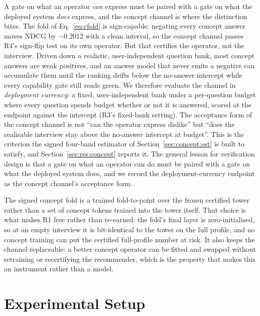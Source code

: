 \documentclass[acmsmall,review,anonymous]{acmart}
\begin{document}
A gate on what an operator \emph{can} express must be paired with a gate on what the deployed system \emph{does} express, and the concept channel is where the distinction bites. The fold of Eq.~\eqref{eq:cfold} is sign-capable: negating every concept answer moves NDCG by $-0.2012$ with a clean interval, so the concept channel passes R4's sign-flip test on its own operator. But that certifies the operator, not the interview. Driven down a realistic, user-independent question bank, most concept answers are weak positives, and an answer model that never emits a negative can accumulate them until the ranking drifts below the no-answer intercept while every capability gate still reads green. We therefore evaluate the channel in \emph{deployment currency}: a fixed, user-independent bank under a per-question budget where every question spends budget whether or not it is answered, scored at the endpoint against the intercept (R3's fixed-bank setting). The acceptance form of the concept channel is not ``can the operator express dislike'' but ``does the realisable interview stay above the no-answer intercept at budget''. This is the criterion the signed four-band estimator of Section~\ref{sec:concept:est} is built to satisfy, and Section~\ref{sec:res:concept} reports it. The general lesson for verification design is that a gate on what an operator can do must be paired with a gate on what the deployed system does, and we record the deployment-currency endpoint as the concept channel's acceptance form.

The signed concept fold is a trained fold-to-point over the frozen certified tower rather than a set of concept tokens trained into the tower itself. That choice is what makes R1 free rather than re-earned: the fold's final layer is zero-initialised, so at an empty interview it is bit-identical to the tower on the full profile, and no concept training can put the certified full-profile number at risk. It also keeps the channel replaceable: a better concept operator can be fitted and swapped without retraining or recertifying the recommender, which is the property that makes this an instrument rather than a model.

\section{Experimental Setup}\label{sec:setup}
\end{document}
